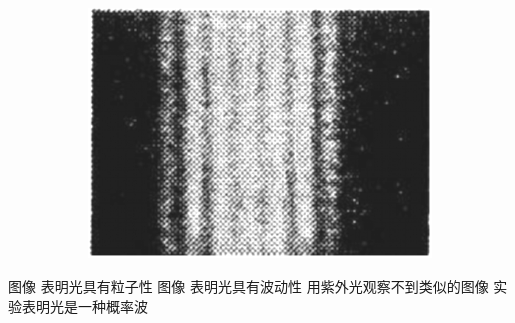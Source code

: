\begin{enumerate}
\begin{figure}[h!]
\begin{subfigure}{0.22\linewidth}
	\end{subfigure}
	\begin{subfigure}{0.22\linewidth}
		\centering
		\includegraphics[width=0.85\linewidth]{picture/screenshot081}
		\caption{}\label{2011上海双缝干涉c}
	\end{subfigure}
\end{figure}
 

\fourchoices
{图像  表明光具有粒子性}
{图像  表明光具有波动性}
{用紫外光观察不到类似的图像}
{实验表明光是一种概率波}






	
	
	
\end{enumerate}

